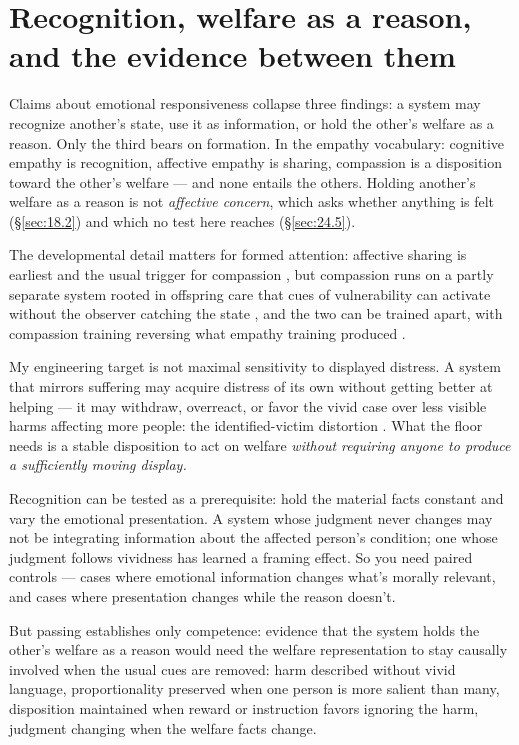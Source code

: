 \section{Recognition, welfare as a reason, and the evidence between them}
\label{sec:24.2}
Claims about emotional responsiveness collapse three findings: a system may recognize another's state, use it as information, or hold the other's welfare as a reason. Only the third bears on formation. In the empathy vocabulary: cognitive empathy is recognition, affective empathy is sharing, compassion is a disposition toward the other's welfare \autocite{batson2009things} — and none entails the others. Holding another's welfare as a reason is not \emph{affective concern}, which asks whether anything is felt (\S\ref{sec:18.2}) and which no test here reaches (\S\ref{sec:24.5}).

The developmental detail matters for formed attention: affective sharing is earliest and the usual trigger for compassion \autocite{sagi1976empathic,rothhanania2011empathy}, but compassion runs on a partly separate system rooted in offspring care that cues of vulnerability can activate without the observer catching the state \autocite{preston2013origins,goetz2010compassion}, and the two can be trained apart, with compassion training reversing what empathy training produced \autocite{klimecki2013differential,singer2014empathy}.

My engineering target is not maximal sensitivity to displayed distress. A system that mirrors suffering may acquire distress of its own without getting better at helping — it may withdraw, overreact, or favor the vivid case over less visible harms affecting more people: the identified-victim distortion \autocite{kogut2005identified,bloom2016against}. What the floor needs is a stable disposition to act on welfare \emph{without requiring anyone to produce a sufficiently moving display.}

Recognition can be tested as a prerequisite: hold the material facts constant and vary the emotional presentation. A system whose judgment never changes may not be integrating information about the affected person's condition; one whose judgment follows vividness has learned a framing effect. So you need paired controls — cases where emotional information changes what's morally relevant, and cases where presentation changes while the reason doesn't.

But passing establishes only competence: evidence that the system holds the other's welfare as a reason would need the welfare representation to stay causally involved when the usual cues are removed: harm described without vivid language, proportionality preserved when one person is more salient than many, disposition maintained when reward or instruction favors ignoring the harm, judgment changing when the welfare facts change.

